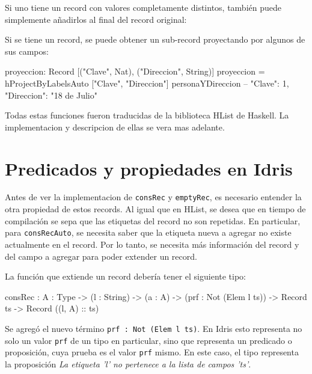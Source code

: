 Si uno tiene un record con valores completamente distintos, también puede simplemente añadirlos al final del record original:


Si se tiene un record, se puede obtener un sub-record proyectando por algunos de sus campos:

\begin{code}
proyeccion: Record [("Clave", Nat), ("Direccion", String)]
proyeccion = hProjectByLabelsAuto ["Clave", "Direccion"] 
  personaYDireccion
-- { "Clave": 1, "Direccion": "18 de Julio"}
\end{code}

Todas estas funciones fueron traducidas de la biblioteca HList de Haskell. La implementacion y descripcion de ellas se vera mas adelante.

\section{Predicados y propiedades en Idris}

Antes de ver la implementacion de \texttt{consRec} y \texttt{emptyRec}, es necesario entender la otra propiedad de estos records. Al igual que en HList, se desea que en tiempo de compilación se sepa que las etiquetas del record no son repetidas. En particular, para \texttt{consRecAuto}, se necesita saber que la etiqueta nueva a agregar no existe actualmente en el record. Por lo tanto, se necesita más información del record y del campo a agregar para poder extender un record.

La función que extiende un record debería tener el siguiente tipo:

\begin{code}
consRec : {A : Type} -> (l : String) -> (a : A) -> 
 (prf : Not (Elem l ts)) -> Record ts -> Record ((l, A) :: ts)
\end{code}

Se agregó el nuevo término \texttt{prf : Not (Elem l ts)}. En Idris esto representa no solo un valor \texttt{prf} de un tipo en particular, sino que representa un predicado o proposición, cuya prueba es el valor \texttt{prf} mismo. En este caso, el tipo representa la proposición \textit{La etiqueta 'l' no pertenece a la lista de campos 'ts'}.

